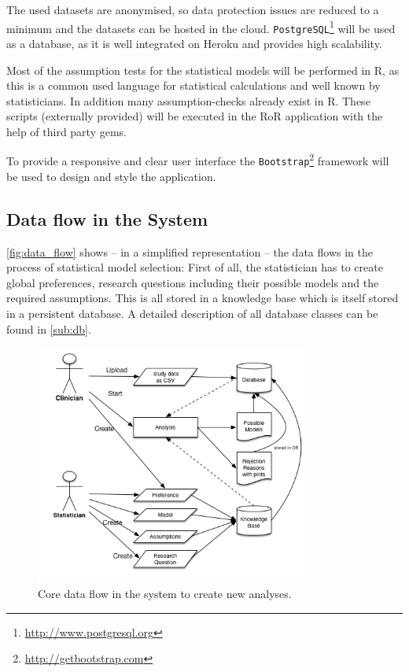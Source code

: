 The used datasets are anonymised, so data protection issues are reduced to a minimum and the datasets can be hosted in the cloud. \texttt{PostgreSQL}\footnote{\href{http://www.postgresql.org}{http://www.postgresql.org}} will be used as a database, as it is well integrated on Heroku and provides high scalability.

Most of the assumption tests for the statistical models will be performed in \gls{R}, as this is a common used language for statistical calculations and well known by statisticians. In addition many assumption-checks already exist in \gls{R}. These scripts (externally provided) will be executed in the \gls{RoR} application with the help of third party gems.

To provide a responsive and clear user interface the \texttt{Bootstrap}\footnote{\href{http://getbootstrap.com}{http://getbootstrap.com}} framework will be used to design and style the application. 

\subsection{Data flow in the System}

\autoref{fig:data_flow} shows -- in a simplified representation -- the data flows in the process of statistical model selection: First of all, the statistician has to create global preferences, research questions including their possible models and the required assumptions. This is all stored in a knowledge base which is itself stored in  a persistent database. A detailed description of all database classes can be found in \autoref{sub:db}. 

\begin{figure}[!h]
\centering
\includegraphics[width=0.8\textwidth]{figures/data_flow}
\caption{Core data flow in the system to create new analyses.}
\label{fig:data_flow}
\end{figure}


